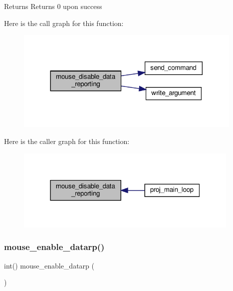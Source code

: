 \begin{DoxyReturn}{Returns}
Returns 0 upon success 
\end{DoxyReturn}
Here is the call graph for this function\+:
\nopagebreak
\begin{figure}[H]
\begin{center}
\leavevmode
\includegraphics[width=308pt]{group__mouse_ga7e311379d4d64f88873ef8ade5c82a25_cgraph}
\end{center}
\end{figure}
Here is the caller graph for this function\+:
\nopagebreak
\begin{figure}[H]
\begin{center}
\leavevmode
\includegraphics[width=304pt]{group__mouse_ga7e311379d4d64f88873ef8ade5c82a25_icgraph}
\end{center}
\end{figure}
\mbox{\label{group__mouse_ga90562ec8e969e4014d728adb0fc91e31}} 
\subsubsection{\texorpdfstring{mouse\+\_\+enable\+\_\+datarp()}{mouse\_enable\_datarp()}}
{\footnotesize\ttfamily int() mouse\+\_\+enable\+\_\+datarp (\begin{DoxyParamCaption}{ }\end{DoxyParamCaption})}




